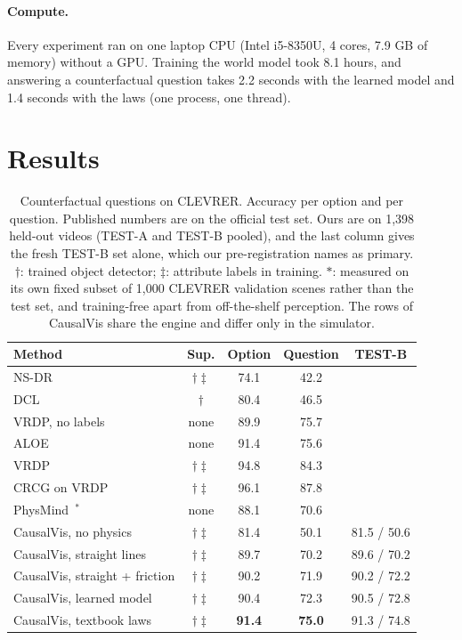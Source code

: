 \IfFileExists{TMLR}{\documentclass[10pt]{article}}%
\newcommand{\sys}{CausalVis}
\begin{document}
\paragraph{Compute.}
Every experiment ran on one laptop CPU (Intel i5-8350U, 4 cores, 7.9 GB of memory) without a GPU.
Training the world model took 8.1 hours, and answering a counterfactual question takes 2.2 seconds with the learned model and 1.4 seconds with the laws (one process, one thread).

\section{Results}
\label{sec:results}

\begin{table}[tb]
\caption{Counterfactual questions on CLEVRER. Accuracy per option and per question. Published numbers are on the official test set. Ours are on 1,398 held-out videos (TEST-A and TEST-B pooled), and the last column gives the fresh TEST-B set alone, which our pre-registration names as primary. $\dagger$: trained object detector; $\ddagger$: attribute labels in training. $\ast$: measured on its own fixed subset of 1,000 CLEVRER validation scenes rather than the test set, and training-free apart from off-the-shelf perception. The rows of \sys{} share the engine and differ only in the simulator.}
\label{tab:main}
\centering
\small
\setlength{\tabcolsep}{3pt}
\begin{tabular}{@{}lcccc@{}}
\toprule
Method & Sup. & Option & Question & TEST-B \\
\midrule
NS-DR~\cite{yi2020clevrer} & $\dagger\ddagger$ & 74.1 & 42.2 & \\
DCL~\cite{chen2021dcl} & $\dagger$ & 80.4 & 46.5 & \\
VRDP, no labels~\cite{ding2021vrdp} & none & 89.9 & 75.7 & \\
ALOE~\cite{ding2021aloe} & none & 91.4 & 75.6 & \\
VRDP~\cite{ding2021vrdp} & $\dagger\ddagger$ & 94.8 & 84.3 & \\
CRCG on VRDP~\cite{ishay2024crcg} & $\dagger\ddagger$ & 96.1 & 87.8 & \\
PhysMind~\cite{yang2026physmind}$^{\ast}$ & none & 88.1 & 70.6 & \\
\midrule
\sys{}, no physics & $\dagger\ddagger$ & 81.4 & 50.1 & 81.5 / 50.6 \\
\sys{}, straight lines & $\dagger\ddagger$ & 89.7 & 70.2 & 89.6 / 70.2 \\
\sys{}, straight + friction & $\dagger\ddagger$ & 90.2 & 71.9 & 90.2 / 72.2 \\
\sys{}, learned model & $\dagger\ddagger$ & 90.4 & 72.3 & 90.5 / 72.8 \\
\sys{}, textbook laws & $\dagger\ddagger$ & \textbf{91.4} & \textbf{75.0} & 91.3 / 74.8 \\
\bottomrule
\end{tabular}
\end{table}
\end{document}
